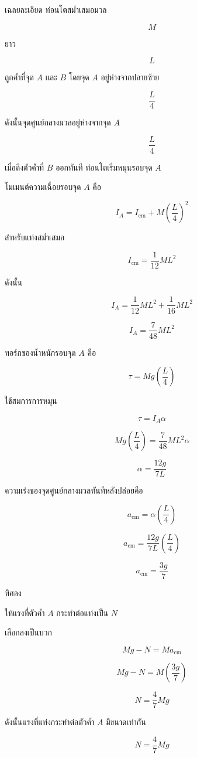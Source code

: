 \begin{examplebox}{เฉลยละเอียด}
ท่อนโตสม่ำเสมอมวล

\[
M
\]

ยาว

\[
L
\]

ถูกค้ำที่จุด $A$ และ $B$ โดยจุด $A$ อยู่ห่างจากปลายซ้าย

\[
\frac{L}{4}
\]

ดังนั้นจุดศูนย์กลางมวลอยู่ห่างจากจุด $A$

\[
\frac{L}{4}
\]

เมื่อดึงตัวค้ำที่ $B$ ออกทันที ท่อนโตเริ่มหมุนรอบจุด $A$

โมเมนต์ความเฉื่อยรอบจุด $A$ คือ

\[
I_A=I_{\text{cm}}+M\left(\frac{L}{4}\right)^2
\]

สำหรับแท่งสม่ำเสมอ

\[
I_{\text{cm}}=\frac{1}{12}ML^2
\]

ดังนั้น

\[
I_A=\frac{1}{12}ML^2+\frac{1}{16}ML^2
\]

\[
I_A=\frac{7}{48}ML^2
\]

ทอร์กของน้ำหนักรอบจุด $A$ คือ

\[
\tau=Mg\left(\frac{L}{4}\right)
\]

ใช้สมการการหมุน

\[
\tau=I_A\alpha
\]

\[
Mg\left(\frac{L}{4}\right)=\frac{7}{48}ML^2\alpha
\]

\[
\alpha=\frac{12g}{7L}
\]

ความเร่งของจุดศูนย์กลางมวลทันทีหลังปล่อยคือ

\[
a_{\text{cm}}=\alpha\left(\frac{L}{4}\right)
\]

\[
a_{\text{cm}}=\frac{12g}{7L}\left(\frac{L}{4}\right)
\]

\[
a_{\text{cm}}=\frac{3g}{7}
\]

ทิศลง

ให้แรงที่ตัวค้ำ $A$ กระทำต่อแท่งเป็น $N$

เลือกลงเป็นบวก

\[
Mg-N=Ma_{\text{cm}}
\]

\[
Mg-N=M\left(\frac{3g}{7}\right)
\]

\[
N=\frac{4}{7}Mg
\]

ดังนั้นแรงที่แท่งกระทำต่อตัวค้ำ $A$ มีขนาดเท่ากัน

\[
\boxed{N=\frac{4}{7}Mg}
\]
\end{examplebox}

